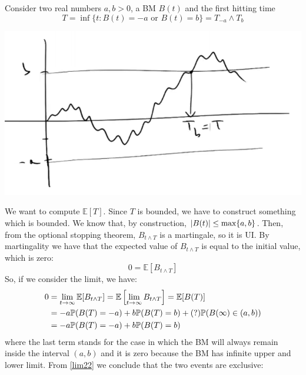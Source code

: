 \begin{example}{}{}{} %
    Consider two real numbers $a,b>0$, a BM $B(t)$ and the first hitting time
    \begin{equation}
        T = \inf\{t:B(t) = -a \text{ or } B(t) = b\} = T_{-a}\wedge T_{b}
    \end{equation}
    \begin{center}
        \includegraphics[scale=0.26]{fig/tmp/fig35.png}
    \end{center}
    We want to compute $\mathbb{E}[T]$. Since $T$ is bounded, we have to construct something which is bounded. We know that, by construction, $\abs{B(t)}\le\max\{a,b\}$. Then, from the optional stopping theorem, $B_{t\wedge T}$ is a martingale, so it is UI. By martingality we have that the expected value of $B_{t\wedge T}$ is equal to the initial value, which is zero:
    \begin{equation*}
        0 = \mathbb{E}[B_{t\wedge T}]
    \end{equation*}
    So, if we consider the limit, we have:
    \begin{align}\label{lim22}
        \notag 0 &= \lim_{t\to\infty}\mathbb{E}[B_{t\wedge T}] = \mathbb{E}\left[\lim_{t\to\infty} B_{t\wedge T}\right] = \mathbb{E}[B(T)] \\
        &=
        \notag -a\mathbb{P}(B(T)=-a) + b\mathbb{P}(B(T)=b) + (?)\mathbb{P}(B(\infty)\in(a,b)) \\
        &=
        -a\mathbb{P}(B(T)=-a) + b\mathbb{P}(B(T)=b)
    \end{align}
    where the last term stands for the case in which the BM will always remain inside the interval $(a,b)$ and it is zero because the BM has infinite upper and lower limit. From \eqref{lim22} we conclude that the two events are exclusive:
    \begin{equation}

\end{equation}
\end{example}
